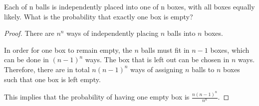 \begin{exercise}{39}
    Each of n balls is independently placed into one of n boxes, with all boxes equally likely.
What is the probability that exactly one box is empty?
\end{exercise}

\begin{proof}
    There are $n^n$ ways of independently placing $n$ balls into $n$ boxes.

    In order for one box to remain empty, the $n$ balls must fit in $n-1$ boxes, which can be done in $(n-1)^n$ ways. The box that is left out can be chosen in $n$ ways. Therefore, there are in total $n(n-1)^n$ ways of assigning $n$ balls to $n$ boxes such that one box is left empty.

    This implies that the probability of having one empty box is $\frac{n(n-1)^n}{n^n}$. 
\end{proof}
\newpage
